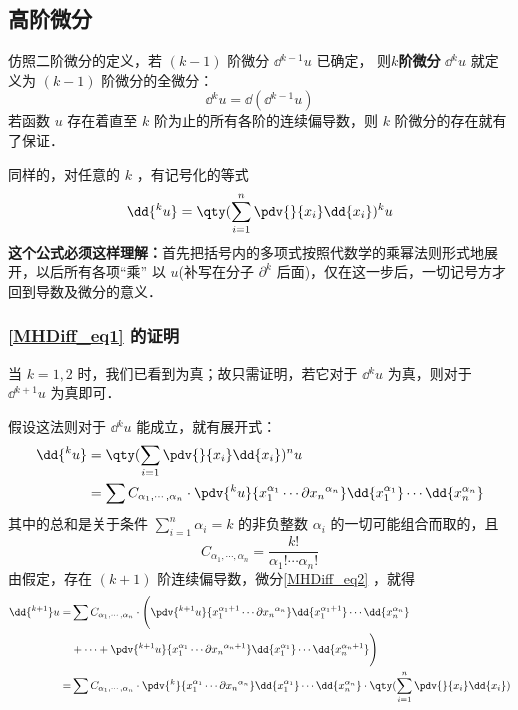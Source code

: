 \subsection{高阶微分}
仿照二阶微分的定义，若 $(k-1)$ 阶微分 $\dd{^{k-1}}u$ 已确定， 则\textbf{$k$阶微分} $\dd{^ku}$ 就定义为 $(k-1)$ 阶微分的全微分：
\begin{equation}
\dd{^k u}=\dd{(\dd{^{k-1}}u)}
\end{equation}
若函数 $u$ 存在着直至 $k$ 阶为止的所有各阶的连续偏导数，则 $k$ 阶微分的存在就有了保证．

 同样的，对任意的 $k$ ，有记号化的等式
 \begin{equation}\label{MHDiff_eq1}
 \dd{^ku}=\qty(\sum_{i=1}^n\pdv{}{x_i}\dd{x_i})^k u
 \end{equation}
 \textbf{这个公式必须这样理解：}首先把括号内的多项式按照代数学的乘幂法则形式地展开，以后所有各项“乘” 以 $u$(补写在分子 $\partial^k$ 后面)，仅在这一步后，一切记号方才回到导数及微分的意义．
 \subsubsection{\autoref{MHDiff_eq1} 的证明}
 当 $k=1,2$ 时，我们已看到为真；故只需证明，若它对于 $\dd{^k u}$ 为真，则对于 $\dd{^{k+1}u}$ 为真即可．
 
 假设这法则对于 $\dd{^k u}$ 能成立，就有展开式：
 \begin{equation}\label{MHDiff_eq2}
 \begin{aligned}
 \dd{^k u}&=\qty(\sum_{i=1}\pdv{}{x_i}\dd{x_i})^n u\\
 &=\sum C_{\alpha_1,\cdots,\alpha_n}\cdot\pdv{^k u}{x_1^{\alpha_1}\cdots\partial{x_n}^{\alpha_n}}\dd{x_1^{\alpha_1}}\cdots\dd{x_n^{\alpha_n}}
 \end{aligned}
 \end{equation}
 其中的总和是关于条件 $\sum_{i=1}^n\alpha_i=k$ 的非负整数 $\alpha_i$ 的一切可能组合而取的，且
 \begin{equation}
 C_{\alpha_1,\cdots,\alpha_n}=\frac{k!}{\alpha_1!\cdots\alpha_n!}
 \end{equation}
 由假定，存在 $(k+1)$ 阶连续偏导数，微分\autoref{MHDiff_eq2} ，就得
 \begin{equation}
  \begin{aligned}
 \dd{^{k+1}}u=&\sum C_{\alpha_1,\cdots,\alpha_n}\cdot\Bigg(\pdv{^{k+1} u}{x_1^{\alpha_1+1}\cdots\partial{x_n}^{\alpha_n}}\dd{x_1^{\alpha_1+1}}\cdots\dd{x_n^{\alpha_n}}\\
 &+\cdots+\pdv{^{k+1} u}{x_1^{\alpha_1}\cdots\partial{x_n}^{\alpha_n+1}}\dd{x_1^{\alpha_1}}\cdots\dd{x_n^{\alpha_n+1}}\Bigg)\\
 =&\sum C_{\alpha_1,\cdots,\alpha_n}\cdot\pdv{^{k} }{x_1^{\alpha_1}\cdots\partial{x_n}^{\alpha_n}}\dd{x_1^{\alpha_1}}\cdots\dd{x_n^{\alpha_n}}\cdot\qty(\sum_{i=1}^n\pdv{}{x_i}\dd{x_i})
 \end{aligned}
 \end{equation}
 